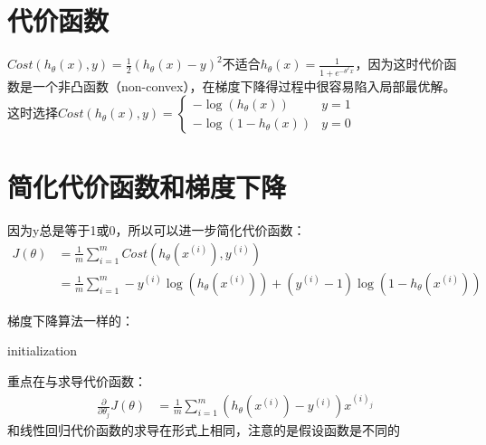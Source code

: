 \documentclass[../main.tex]{subfiles}
\begin{document}
\section{代价函数}
\(Cost(h_θ(x), y) = \frac{1}{2}(h_θ(x) - y)^2\)不适合\(h_θ(x)=\frac{1}{1+e^{-θ^Tx}}\)，因为这时代价函数是一个非凸函数（non-convex），在梯度下降得过程中很容易陷入局部最优解。这时选择\(Cost(h_θ(x), y) = \begin{cases}
    -\log(h_θ(x))    & y = 1 \\
    -\log(1- h_θ(x)) & y = 0
\end{cases}\)

\begin{figure}[H]
    \centering
\end{figure}

\section{简化代价函数和梯度下降}
因为y总是等于1或0，所以可以进一步简化代价函数：
\begin{align*}
    J(θ) & = \frac{1}{m}\sum\limits_{i=1}^{m}Cost(h_θ(x^{(i)}), y^{(i)})                                   \\
         & = \frac{1}{m}\sum\limits_{i=1}^{m}-y^{(i)}\log(h_θ(x^{(i)})) + (y^{(i)}-1)\log(1- h_θ(x^{(i)}))
\end{align*}


梯度下降算法一样的：\\
\begin{algorithm}[H]
    initialization\;
\end{algorithm}
重点在与求导代价函数：
\begin{align*}
    \frac{∂}{∂θ_j}J(θ) & = \frac{1}{m}\sum\limits_{i=1}^{m}(h_θ(x^{(i)}) - y^{(i)})x^{(i)_j}
\end{align*}
和线性回归代价函数的求导在形式上相同，注意的是假设函数是不同的
\end{document}
